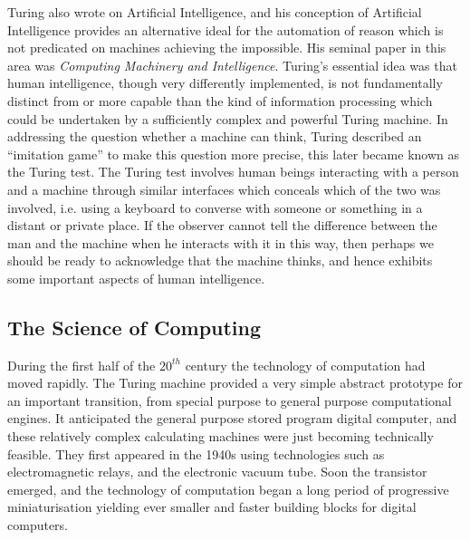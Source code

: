 Turing also wrote on Artificial Intelligence, and his conception of
Artificial Intelligence provides an alternative ideal for the
automation of reason which is not predicated on machines achieving the
impossible.
His seminal paper in this area was \emph{Computing Machinery and Intelligence}\cite{turingCMI}.
Turing's essential idea was that human intelligence, though very
differently implemented, is not fundamentally distinct from or more
capable than the kind of information processing which could be
undertaken by a sufficiently complex and powerful Turing machine.
In addressing the question whether a machine can think, Turing
described an ``imitation game'' to make this question more precise,
this later became known as the Turing test.
The Turing test involves human beings interacting with a person and a
machine through similar interfaces which conceals which of the two was
involved, i.e. using a keyboard to converse with someone or something
in a distant or private place.
If the observer cannot tell the difference between the man and the
machine when he interacts with it in this way, then perhaps we should
be ready to acknowledge that the machine thinks, and hence exhibits
some important aspects of human intelligence.

\subsection{The Science of Computing}

During the first half of the $20^{th}$ century the technology of
computation had  moved rapidly.
The Turing machine provided a very simple abstract prototype for an
important transition, from special purpose to general purpose
computational engines.
It anticipated the general purpose stored program digital computer,
and these relatively complex calculating machines were just becoming
technically feasible.
They first appeared in the 1940s using technologies such as
electromagnetic relays, and the electronic vacuum tube.
Soon the transistor emerged, and the technology of computation began a
long period of progressive miniaturisation yielding ever smaller and
faster building blocks for digital computers.


